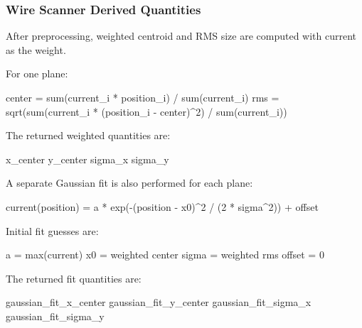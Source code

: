 \documentclass[
]{article}
\newenvironment{Shaded}{}{}
\newcommand{\NormalTok}[1]{#1}
\begin{document}
\hypertarget{wire-scanner-derived-quantities}{%
\subsubsection{Wire Scanner Derived
Quantities}\label{wire-scanner-derived-quantities}}

After preprocessing, weighted centroid and RMS size are computed with
current as the weight.

For one plane:

\begin{Shaded}
\begin{Highlighting}[]
\NormalTok{center = sum(current\_i * position\_i) / sum(current\_i)}
\NormalTok{rms    = sqrt(sum(current\_i * (position\_i {-} center)\^{}2) / sum(current\_i))}
\end{Highlighting}
\end{Shaded}

The returned weighted quantities are:

\begin{Shaded}
\begin{Highlighting}[]
\NormalTok{x\_center}
\NormalTok{y\_center}
\NormalTok{sigma\_x}
\NormalTok{sigma\_y}
\end{Highlighting}
\end{Shaded}

A separate Gaussian fit is also performed for each plane:

\begin{Shaded}
\begin{Highlighting}[]
\NormalTok{current(position) = a * exp({-}(position {-} x0)\^{}2 / (2 * sigma\^{}2)) + offset}
\end{Highlighting}
\end{Shaded}

Initial fit guesses are:

\begin{Shaded}
\begin{Highlighting}[]
\NormalTok{a      = max(current)}
\NormalTok{x0     = weighted center}
\NormalTok{sigma  = weighted rms}
\NormalTok{offset = 0}
\end{Highlighting}
\end{Shaded}

The returned fit quantities are:

\begin{Shaded}
\begin{Highlighting}[]
\NormalTok{gaussian\_fit\_x\_center}
\NormalTok{gaussian\_fit\_y\_center}
\NormalTok{gaussian\_fit\_sigma\_x}
\NormalTok{gaussian\_fit\_sigma\_y}
\end{Highlighting}
\end{Shaded}
\end{document}
